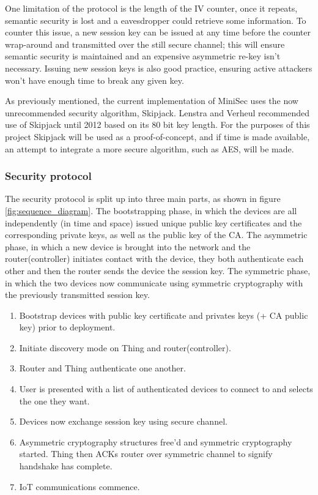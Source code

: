 \documentclass{mprop}
\begin{document}
One limitation of the protocol is the length of the IV counter, once it repeats, semantic security is lost and a eavesdropper could retrieve some information. To counter this issue, a new session key can be issued at any time before the counter wrap-around and transmitted over the still secure channel; this will ensure semantic security is maintained and an expensive asymmetric re-key isn't necessary. Issuing new session keys is also good practice, ensuring active attackers won't have enough time to break any given key.

As previously mentioned, the current implementation of MiniSec uses the now unrecommended security algorithm, Skipjack. Lenstra and Verheul recommended use of Skipjack until 2012 based on its 80 bit key length\cite{SkipjackRecommendation}. For the purposes of this project Skipjack will be used as a proof-of-concept, and if time is made available, an attempt to integrate a more secure algorithm, such as AES, will be made.


\subsubsection{Security protocol} %
\label{ssub:security_protocol}
The security protocol is split up into three main parts, as shown in figure \ref{fig:sequence_diagram}. The bootstrapping phase, in which the devices are all independently (in time and space) issued unique public key certificates and the corresponding private keys, as well as the public key of the CA. The asymmetric phase, in which a new device is brought into the network and the router(controller) initiates contact with the device, they both authenticate each other and then the router sends the device the session key. The symmetric phase, in which the two devices now communicate using symmetric cryptography with the previously transmitted session key.
\begin{enumerate}
  \item Bootstrap devices with public key certificate and privates keys (+ CA public key) prior to deployment.
  \item Initiate discovery mode on Thing and router(controller).
  \item Router and Thing authenticate one another.
  \item User is presented with a list of authenticated devices to connect to and selects the one they want.
  \item Devices now exchange session key using secure channel.
  \item Asymmetric cryptography structures free'd and symmetric cryptography started. Thing then ACKs router over symmetric channel to signify handshake has complete.
  \item IoT communications commence.
\end{enumerate}
\end{document}
